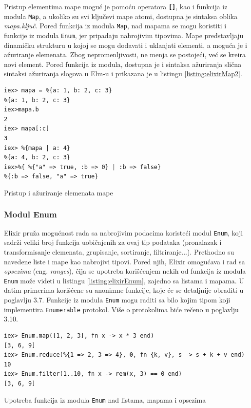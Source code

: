 \documentclass[12pt,oneside]{memoir}
\begin{document}
Pristup elementima mape moguć je pomoću operatora \texttt{\textbf{[\smallskip]}}, kao i
funkcija iz modula \texttt{Map}, a ukoliko su svi ključevi mape atomi, dostupna je 
sintaksa oblika \emph{mapa.ključ}. Pored funkcija iz modula \texttt{Map}, nad mapama se
mogu koristiti i funkcije iz modula \texttt{Enum}, jer pripadaju nabrojivim tipovima.
Mape predstavljaju dinamičku strukturu u kojoj se mogu dodavati i uklanjati elementi,
a moguća je i ažuriranje elemenata. Zbog nepromenljivosti, ne menja se postojeći, već se
kreira novi element. Pored funkcija iz modula, dostupna je i sintaksa ažuriranja slična 
sintaksi ažuriranja slogova u Elm-u i prikazana je u listingu \ref{listing:elixirMap2}. 
\begin{listing}[!h]
\begin{verbatim}
iex> mapa = %{a: 1, b: 2, c: 3}
%{a: 1, b: 2, c: 3}
iex>mapa.b
2
iex> mapa[:c]
3
iex> %{mapa | a: 4}
%{a: 4, b: 2, c: 3}
iex>%{ %{"a" => true, :b => 0} | :b => false}
%{:b => false, "a" => true}
\end{verbatim}
\caption{Pristup i ažuriranje elemenata mape}
\label{listing:elixirMap2}
\end{listing}
\subsubsection{Modul Enum}
Elixir pruža mogućnost rada sa nabrojivim podacima koristeći modul \texttt{Enum}, koji sadrži
veliki broj funkcija uobičajenih za ovaj tip podataka (pronalazak i transformisanje elemenata,
grupisanje, sortiranje, filtriranje...). Prethodno su navedene liste i mape kao nabrojivi tipovi.
Pored njih, Elixir omogućava i rad sa \emph{opsezima} (eng. \emph{ranges}), čija se
upotreba korišćenjem nekih od funkcija iz modula \texttt{Enum} može videti u listingu
\ref{listing:elixirEnum}, zajedno sa listama i mapama. U datim primerima korišćene su anonimne
funkcije, koje će se detaljnije obraditi u poglavlju 3.7. Funkcije iz modula \texttt{Enum}
mogu raditi sa bilo kojim tipom koji implementira \texttt{Enumerable} protokol. Više
o protokolima biće rečeno u poglavlju 3.10.
\begin{listing}[!ht]
\begin{verbatim}
iex> Enum.map([1, 2, 3], fn x -> x * 3 end)
[3, 6, 9]
iex> Enum.reduce(%{1 => 2, 3 => 4}, 0, fn {k, v}, s -> s + k + v end)
10
iex> Enum.filter(1..10, fn x -> rem(x, 3) == 0 end)
[3, 6, 9]
\end{verbatim}
\caption{Upotreba funkcija iz modula \texttt{Enum} nad listama, mapama i opsezima}
\label{listing:elixirEnum}
\end{listing}
\end{document}
